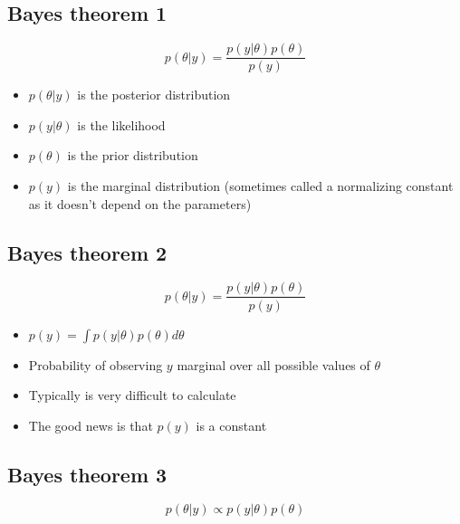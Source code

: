 \documentclass[
  letterpaper,
  DIV=11,
  numbers=noendperiod]{scrartcl}
\providecommand{\tightlist}{%
  \setlength{\itemsep}{0pt}\setlength{\parskip}{0pt}}\usepackage{longtable,booktabs,array}
\begin{document}
\hypertarget{bayes-theorem-1}{%
\subsection{Bayes theorem 1}\label{bayes-theorem-1}}

\Huge

\[p(\theta|y) = \frac{p(y|\theta)p(\theta)}{p(y)}\]

\Large

\begin{itemize}
\tightlist
\item
  \(p(\theta|y)\) is the posterior distribution
\item
  \(p(y|\theta)\) is the likelihood
\item
  \(p(\theta)\) is the prior distribution
\item
  \(p(y)\) is the marginal distribution (sometimes called a normalizing
  constant as it doesn't depend on the parameters)
\end{itemize}

\normalsize

\hypertarget{bayes-theorem-2}{%
\subsection{Bayes theorem 2}\label{bayes-theorem-2}}

\Huge

\[p(\theta|y) = \frac{p(y|\theta)p(\theta)}{p(y)}\]

\Large

\begin{itemize}
\tightlist
\item
  \(p(y) = \int p(y|\theta) p(\theta) d\theta\)
\item
  Probability of observing \(y\) marginal over all possible values of
  \(\theta\)
\item
  Typically is very difficult to calculate
\item
  The good news is that \(p(y)\) is a constant
\end{itemize}

\normalsize

\hypertarget{bayes-theorem-3}{%
\subsection{Bayes theorem 3}\label{bayes-theorem-3}}

\Huge

\[p(\theta|y) \propto p(y|\theta)p(\theta)\]
\end{document}
